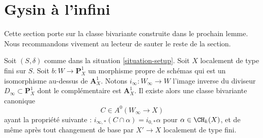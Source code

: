 \section{Gysin à l'infini}
\label{section-gysin-at-infty}

\noindent
Cette section porte sur la classe bivariante construite dans le prochain
lemme. Nous recommandons vivement au lecteur de sauter le reste de la section.

\begin{lemma}
\label{lemma-gysin-at-infty}
Soit $(S, \delta)$ comme dans la situation \ref{situation-setup}.
Soit $X$ localement de type fini sur $S$. Soit
$b : W \to \mathbf{P}^1_X$ un morphisme propre de schémas
qui est un isomorphisme au-dessus de $\mathbf{A}^1_X$.
Notons $i_\infty : W_\infty \to W$ l'image inverse du diviseur
$D_\infty \subset \mathbf{P}^1_X$ dont le complémentaire est $\mathbf{A}^1_X$.
Il existe alors une classe bivariante canonique
$$
C \in A^0(W_\infty \to X)
$$
ayant la propriété suivante :
$i_{\infty, *}(C \cap \alpha) = i_{0, *}\alpha$
pour $\alpha \in \CH_k(X)$, et de même après tout changement de base par
$X' \to X$ localement de type fini.
\end{lemma}

